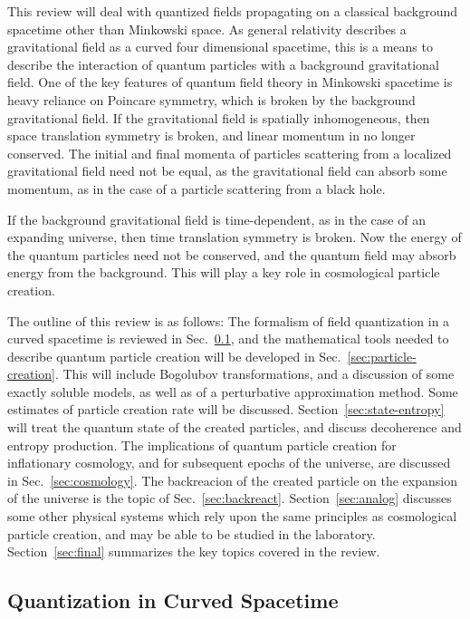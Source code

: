 \documentclass[12pt,onecolumn,eqsecnum,floats,aps,prd,floatfix,titlepage,tightenlines]{revtex4-2}
\begin{document}
This review will deal with quantized fields propagating on a classical background spacetime other than Minkowski
space. As general relativity describes a gravitational field as a curved four dimensional spacetime, this is a means
to describe the interaction of quantum particles with a background  gravitational field. One of the key features of
quantum field theory in Minkowski spacetime is heavy reliance on Poincare symmetry, which is broken by the
background  gravitational field. If the gravitational field is spatially inhomogeneous, then space translation symmetry
is broken, and linear momentum in no longer conserved. The initial and final momenta of particles scattering from
a localized gravitational field need not be equal, as the gravitational field can absorb some momentum, as in the case 
of a particle scattering from a black hole.  

If the background gravitational field is time-dependent, as in the case of an expanding universe, then time translation
symmetry is broken. Now the energy of the quantum particles need not be conserved, and the quantum field may
absorb energy from the background. This will play a key role in cosmological particle creation.

The outline of this review is as follows: The formalism of field quantization in a curved spacetime is reviewed in
Sec.~\ref{sec:quantization}, and the mathematical tools needed to describe quantum particle creation will be developed
in Sec.~\ref{sec:particle-creation}. This will include Bogolubov transformations, and a discussion of some exactly
soluble models, as well as of a perturbative approximation method. Some estimates of particle creation rate will be
discussed. Section~\ref{sec:state-entropy} will treat the quantum state of the created particles, and discuss decoherence
and entropy production. The implications of quantum particle creation for inflationary cosmology, and for subsequent epochs
of the universe, are discussed in Sec.~\ref{sec:cosmology}. The backreacion of the created particle on the expansion of
the universe is the topic of Sec.~\ref{sec:backreact}. Section~\ref{sec:analog} discusses some other physical systems
which rely upon the same principles as cosmological particle creation, and may be able to be studied in the laboratory.
Section~\ref{sec:final} summarizes the key topics covered in the review.




\subsection{Quantization in Curved Spacetime}
\label{sec:quantization}
\end{document}
